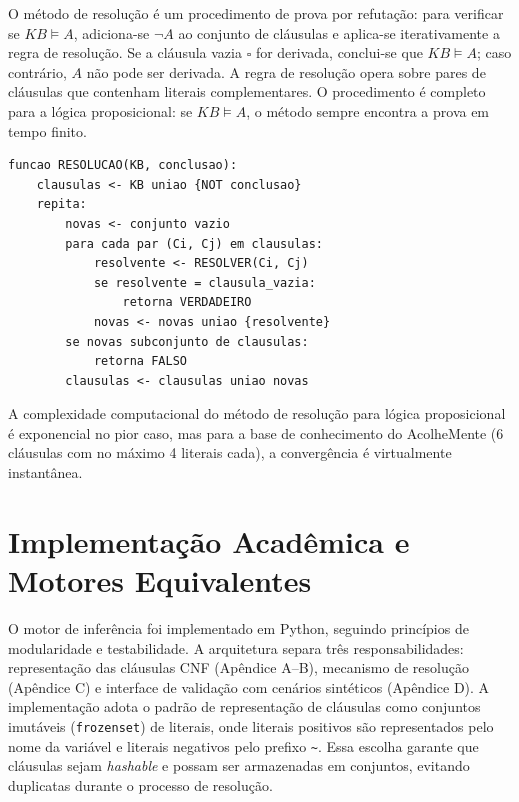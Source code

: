 \documentclass[
    12pt,
    openright,
    oneside,
    a4paper,
    english,
    brazil
]{abntex2}
\begin{document}
O m\'etodo de resolu\c{c}\~ao \'e um procedimento de prova por refuta\c{c}\~ao: para verificar se $KB \models A$, adiciona-se $\neg A$ ao conjunto de cl\'ausulas e aplica-se iterativamente a regra de resolu\c{c}\~ao. Se a cl\'ausula vazia $\square$ for derivada, conclui-se que $KB \models A$; caso contr\'ario, $A$ n\~ao pode ser derivada. A regra de resolu\c{c}\~ao opera sobre pares de cl\'ausulas que contenham literais complementares. O procedimento \'e completo para a l\'ogica proposicional: se $KB \models A$, o m\'etodo sempre encontra a prova em tempo finito.

\begin{lstlisting}[caption={Pseudoc\'odigo do motor de resolu\c{c}\~ao.},label={lst:pseudocodigo}]
funcao RESOLUCAO(KB, conclusao):
    clausulas <- KB uniao {NOT conclusao}
    repita:
        novas <- conjunto vazio
        para cada par (Ci, Cj) em clausulas:
            resolvente <- RESOLVER(Ci, Cj)
            se resolvente = clausula_vazia:
                retorna VERDADEIRO
            novas <- novas uniao {resolvente}
        se novas subconjunto de clausulas:
            retorna FALSO
        clausulas <- clausulas uniao novas
\end{lstlisting}

A complexidade computacional do m\'etodo de resolu\c{c}\~ao para l\'ogica proposicional \'e exponencial no pior caso, mas para a base de conhecimento do AcolheMente (6 cl\'ausulas com no m\'aximo 4 literais cada), a converg\^encia \'e virtualmente instant\^anea.

\chapter{Implementa\c{c}\~ao Acad\^emica e Motores Equivalentes}

O motor de infer\^encia foi implementado em Python, seguindo princ\'ipios de modularidade e testabilidade. A arquitetura separa tr\^es responsabilidades: representa\c{c}\~ao das cl\'ausulas CNF (Ap\^endice A--B), mecanismo de resolu\c{c}\~ao (Ap\^endice C) e interface de valida\c{c}\~ao com cen\'arios sint\'eticos (Ap\^endice D). A implementa\c{c}\~ao adota o padr\~ao de representa\c{c}\~ao de cl\'ausulas como conjuntos imut\'aveis (\texttt{frozenset}) de literais, onde literais positivos s\~ao representados pelo nome da vari\'avel e literais negativos pelo prefixo \texttt{\textasciitilde}. Essa escolha garante que cl\'ausulas sejam \textit{hashable} e possam ser armazenadas em conjuntos, evitando duplicatas durante o processo de resolu\c{c}\~ao.
\end{document}
